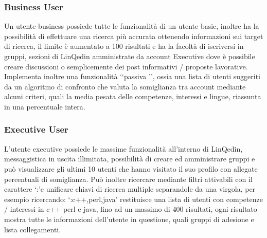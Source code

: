\subsubsection*{Business User}
Un utente business possiede tutte le funzionalità di un utente basic, inoltre ha la possibilità di effettuare una ricerca più accurata ottenendo informazioni sui target di ricerca,
il limite è aumentato a 100 risultati e ha la facoltà di iscriversi in gruppi, sezioni di LinQedin amministrate da account Executive dove è possibile creare discussioni o
semplicemente dei post informativi / proposte lavorative. Implementa inoltre una funzionalità \lq\lq passiva \rq\rq, ossia una lista di utenti suggeriti da un algoritmo di
confronto che valuta la somiglianza tra account mediante alcuni criteri, quali la media pesata delle competenze, interessi e lingue, riassunta in una percentuale intera.
\subsubsection*{Executive User}
L'utente executive possiede le massime funzionalità all'interno di LinQedin, messaggistica in uscita illimitata, possibilità di creare ed amministrare gruppi e può visualizzare
gli ultimi 10 utenti che hanno visitato il suo profilo con allegate percentuali di somiglianza.
Può inoltre ricercare mediante filtri attivabili con il carattere \lq:\rq e unificare chiavi di ricerca multiple separandole da una virgola, per esempio ricercando: \lq:c++,perl,java\rq
restituisce una lista di utenti con competenze / interessi in c++ perl e java, fino ad un massimo di 400 risultati, ogni risultato mostra tutte le informazioni dell'utente in questione,
quali gruppi di adesione e lista collegamenti.
